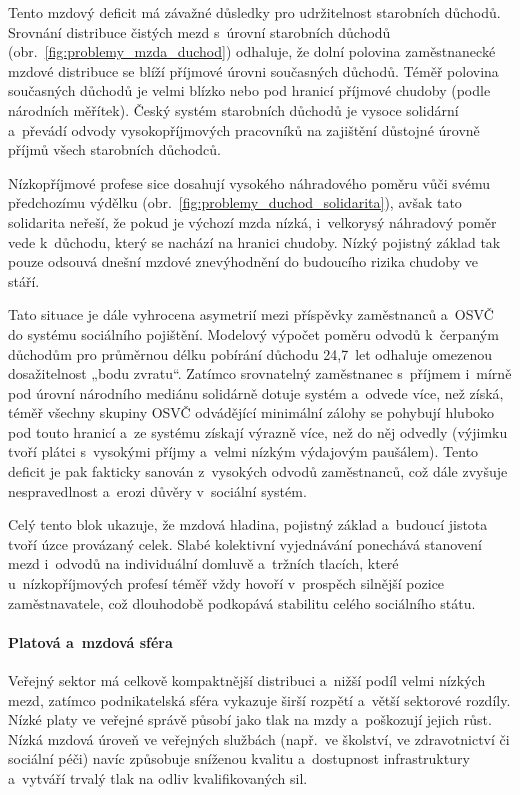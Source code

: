 Tento mzdový deficit má závažné důsledky pro udržitelnost starobních důchodů. Srovnání distribuce čistých mezd s~úrovní starobních důchodů (obr.~\ref{fig:problemy_mzda_duchod}) odhaluje, že dolní polovina zaměstnanecké mzdové distribuce se blíží příjmové úrovni současných důchodů. Téměř polovina současných důchodů je velmi blízko nebo pod hranicí příjmové chudoby (podle národních měřítek). Český systém starobních důchodů je vysoce solidární a~převádí odvody vysokopříjmových pracovníků na zajištění důstojné úrovně příjmů všech starobních důchodců.\par



Nízkopříjmové profese sice dosahují vysokého náhradového poměru vůči svému předchozímu výdělku (obr.~\ref{fig:problemy_duchod_solidarita}), avšak tato solidarita neřeší, že pokud je výchozí mzda nízká, i~velkorysý náhradový poměr vede k~důchodu, který se nachází na hranici chudoby. Nízký pojistný základ tak pouze odsouvá dnešní mzdové znevýhodnění do budoucího rizika chudoby ve stáří.\par



Tato situace je dále vyhrocena asymetrií mezi příspěvky zaměstnanců a~\acs{OSVČ} do systému sociálního pojištění. Modelový výpočet poměru odvodů k~čerpaným důchodům pro průměrnou délku pobírání důchodu 24,7~let odhaluje omezenou dosažitelnost „bodu zvratu“. Zatímco srovnatelný zaměstnanec s~příjmem i~mírně pod úrovní národního mediánu solidárně dotuje systém a~odvede více, než získá, téměř všechny skupiny \acs{OSVČ} odvádějící minimální zálohy se pohybují hluboko pod touto hranicí a~ze systému získají výrazně více, než do něj odvedly (výjimku tvoří plátci s~vysokými příjmy a~velmi nízkým výdajovým paušálem). Tento deficit je pak fakticky sanován z~vysokých odvodů zaměstnanců, což dále zvyšuje nespravedlnost a~erozi důvěry v~sociální systém.\par

%

Celý tento blok ukazuje, že mzdová hladina, pojistný základ a~budoucí jistota tvoří úzce provázaný celek. Slabé kolektivní vyjednávání ponechává stanovení mezd i~odvodů na individuální domluvě a~tržních tlacích, které u~nízkopříjmových profesí téměř vždy hovoří v~prospěch silnější pozice zaměstnavatele, což dlouhodobě podkopává stabilitu celého sociálního státu.\par

\paragraph{Platová a~mzdová sféra}\label{par:platy}
Veřejný sektor má celkově kompaktnější distribuci a~nižší podíl velmi nízkých mezd, zatímco podnikatelská sféra vykazuje širší rozpětí a~větší sektorové rozdíly. Nízké platy ve veřejné správě působí jako tlak na mzdy a~poškozují jejich růst. Nízká mzdová úroveň ve veřejných službách (např.~ve školství, ve zdravotnictví či sociální péči) navíc způsobuje sníženou kvalitu a~dostupnost infrastruktury a~vytváří trvalý tlak na odliv kvalifikovaných sil.\par